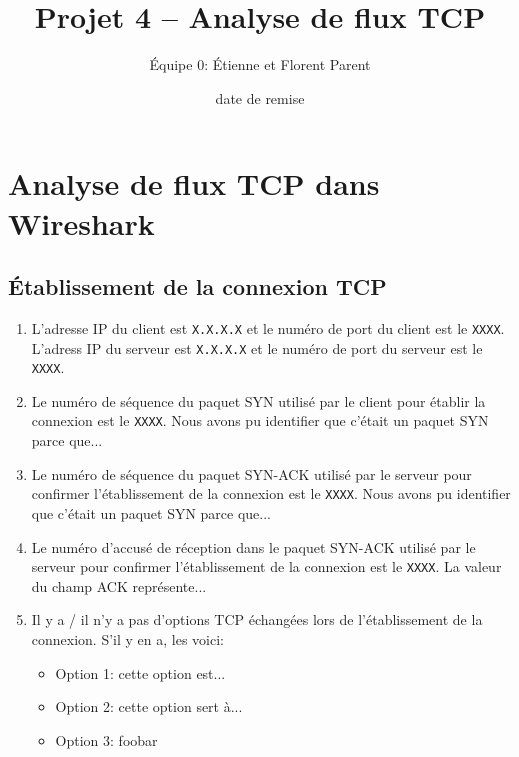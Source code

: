 \documentclass[]{article}
\title{Projet 4 -- Analyse de flux TCP}
\author{Équipe 0: Étienne et Florent Parent} %
\date{date de remise} %
\begin{document}
\maketitle

\section*{Analyse de flux TCP dans Wireshark}

\subsection*{Établissement de la connexion TCP}

\begin{enumerate}
      \item L'adresse IP du client est \texttt{X.X.X.X} et le numéro de port du client est le
            \texttt{XXXX}. L'adress IP du serveur est \texttt{X.X.X.X} et le numéro de port du
            serveur est le \texttt{XXXX}.
      \item Le numéro de séquence du paquet SYN utilisé par le client pour établir la connexion
            est le \texttt{XXXX}. Nous avons pu identifier que c'était un paquet SYN parce que...
      \item Le numéro de séquence du paquet SYN-ACK utilisé par le serveur pour confirmer l'établissement
            de la connexion est le \texttt{XXXX}. Nous avons pu identifier que c'était un paquet SYN parce que...
      \item Le numéro d'accusé de réception dans le paquet SYN-ACK utilisé par le serveur pour confirmer
            l'établissement de la connexion est le \texttt{XXXX}. La valeur du champ ACK représente...

      \item Il y a / il n'y a pas d'options TCP échangées lors de l'établissement de la connexion. S'il
            y en a, les voici:
            \begin{itemize}
                  \item Option 1: cette option est...
                  \item Option 2: cette option sert à...
                  \item Option 3: foobar
            \end{itemize}
      

\end{enumerate}
\end{document}
